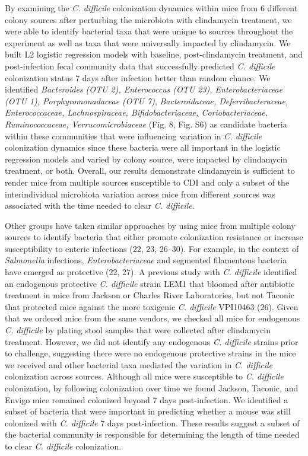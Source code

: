 \documentclass[11pt,]{article}
\begin{document}
By examining the \emph{C. difficile} colonization dynamics within mice
from 6 different colony sources after perturbing the microbiota with
clindamycin treatment, we were able to identify bacterial taxa that were
unique to sources throughout the experiment as well as taxa that were
universally impacted by clindamycin. We built L2 logistic regression
models with baseline, post-clindamycin treatment, and post-infection
fecal community data that successfully predicted \emph{C. difficile}
colonization status 7 days after infection better than random chance. We
identified \emph{Bacteroides (OTU 2), Enterococcus (OTU 23),
Enterobacteriaceae (OTU 1), Porphyromonadaceae (OTU 7)},
\emph{Bacteroidaceae, Deferribacteraceae, Enterococcaceae,
Lachnospiraceae, Bifidobacteriaceae, Coriobacteriaceae, Ruminococcaceae,
Verrucomicrobiaceae} (Fig. 8, Fig. S6) as candidate bacteria within
these communities that were influencing variation in \emph{C. difficile}
colonization dynamics since these bacteria were all important in the
logistic regression models and varied by colony source, were impacted by
clindamycin treatment, or both. Overall, our results demonstrate
clindamycin is sufficient to render mice from multiple sources
susceptible to CDI and only a subset of the interindividual microbiota
variation across mice from different sources was associated with the
time needed to clear \emph{C. difficile}.

Other groups have taken similar approaches by using mice from multiple
colony sources to identify bacteria that either promote colonization
resistance or increase susceptibility to enteric infections (22, 23,
26--30). For example, in the context of \emph{Salmonella} infections,
\emph{Enterobacteriaceae} and segmented filamentous bacteria have
emerged as protective (22, 27). A previous study with \emph{C.
difficile} identified an endogenous protective \emph{C. difficile}
strain LEM1 that bloomed after antibiotic treatment in mice from Jackson
or Charles River Laboratories, but not Taconic that protected mice
against the more toxigenic \emph{C. difficile} VPI10463 (26). Given that
we ordered mice from the same vendors, we checked all mice for
endogenous \emph{C. difficile} by plating stool samples that were
collected after clindamycin treatment. However, we did not identify any
endogenous \emph{C. difficile} strains prior to challenge, suggesting
there were no endogenous protective strains in the mice we received and
other bacterial taxa mediated the variation in \emph{C. difficile}
colonization across sources. Although all mice were susceptible to
\emph{C. difficile} colonization, by following colonization over time we
found Jackson, Taconic, and Envigo mice remained colonized beyond 7 days
post-infection. We identified a subset of bacteria that were important
in predicting whether a mouse was still colonized with \emph{C.
difficile} 7 days post-infection. These results suggest a subset of the
bacterial community is responsible for determining the length of time
needed to clear \emph{C. difficile} colonization.
\end{document}

